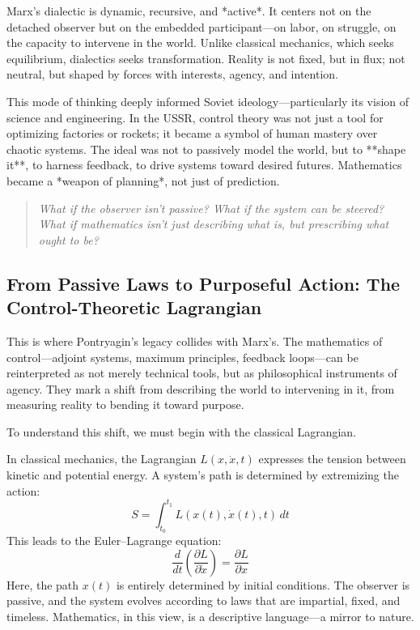 Marx's dialectic is dynamic, recursive, and *active*. It centers not on the detached observer but on the embedded participant—on labor, on struggle, on the capacity to intervene in the world. Unlike classical mechanics, which seeks equilibrium, dialectics seeks transformation. Reality is not fixed, but in flux; not neutral, but shaped by forces with interests, agency, and intention.

This mode of thinking deeply informed Soviet ideology—particularly its vision of science and engineering. In the USSR, control theory was not just a tool for optimizing factories or rockets; it became a symbol of human mastery over chaotic systems. The ideal was not to passively model the world, but to **shape it**, to harness feedback, to drive systems toward desired futures. Mathematics became a *weapon of planning*, not just of prediction.

\begin{quote}
\emph{What if the observer isn’t passive? What if the system can be steered? What if mathematics isn't just describing what is, but prescribing what ought to be?}
\end{quote}

\subsection{From Passive Laws to Purposeful Action: The Control-Theoretic Lagrangian}

This is where Pontryagin’s legacy collides with Marx’s. The mathematics of control—adjoint systems, maximum principles, feedback loops—can be reinterpreted as not merely technical tools, but as philosophical instruments of agency. They mark a shift from describing the world to intervening in it, from measuring reality to bending it toward purpose.

To understand this shift, we must begin with the classical Lagrangian.

In classical mechanics, the Lagrangian \( L(x, \dot{x}, t) \) expresses the tension between kinetic and potential energy. A system’s path is determined by extremizing the action:
\[
S = \int_{t_0}^{t_1} L(x(t), \dot{x}(t), t) \, dt
\]
This leads to the Euler–Lagrange equation:
\[
\frac{d}{dt} \left( \frac{\partial L}{\partial \dot{x}} \right) = \frac{\partial L}{\partial x}
\]
Here, the path \( x(t) \) is entirely determined by initial conditions. The observer is passive, and the system evolves according to laws that are impartial, fixed, and timeless. Mathematics, in this view, is a descriptive language—a mirror to nature.

